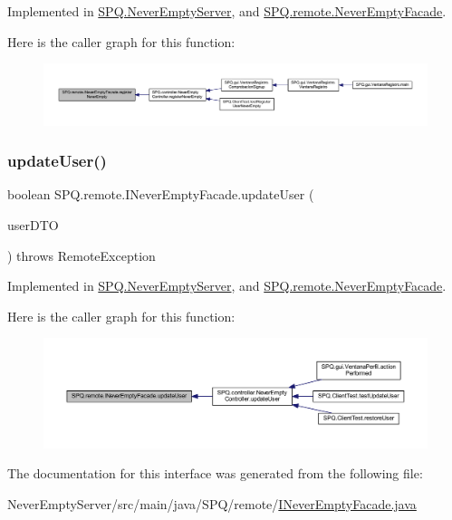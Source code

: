 Implemented in \mbox{\hyperlink{class_s_p_q_1_1_never_empty_server_ae52815c925e04018d6a1b2742d605063}{S\+P\+Q.\+Never\+Empty\+Server}}, and \mbox{\hyperlink{class_s_p_q_1_1remote_1_1_never_empty_facade_a52a0feff1dfb3347e55e46c3ac48fafc}{S\+P\+Q.\+remote.\+Never\+Empty\+Facade}}.

Here is the caller graph for this function\+:\nopagebreak
\begin{figure}[H]
\begin{center}
\leavevmode
\includegraphics[width=350pt]{interface_s_p_q_1_1remote_1_1_i_never_empty_facade_a7867e1e698fea32a535a1daeda4e8d6a_icgraph}
\end{center}
\end{figure}
\mbox{\label{interface_s_p_q_1_1remote_1_1_i_never_empty_facade_add6dafb25f59c549e924c76c6e8f31c6}} 
\subsubsection{\texorpdfstring{update\+User()}{updateUser()}}
{\footnotesize\ttfamily boolean S\+P\+Q.\+remote.\+I\+Never\+Empty\+Facade.\+update\+User (\begin{DoxyParamCaption}\item[{\mbox{\hyperlink{class_s_p_q_1_1dto_1_1_user_d_t_o}{User\+D\+TO}}}]{user\+D\+TO }\end{DoxyParamCaption}) throws Remote\+Exception}



Implemented in \mbox{\hyperlink{class_s_p_q_1_1_never_empty_server_ad39f95ea2309841407f7e8b9e1b9f664}{S\+P\+Q.\+Never\+Empty\+Server}}, and \mbox{\hyperlink{class_s_p_q_1_1remote_1_1_never_empty_facade_a55ad685d3c176424a7f5f18e5ebe043b}{S\+P\+Q.\+remote.\+Never\+Empty\+Facade}}.

Here is the caller graph for this function\+:\nopagebreak
\begin{figure}[H]
\begin{center}
\leavevmode
\includegraphics[width=350pt]{interface_s_p_q_1_1remote_1_1_i_never_empty_facade_add6dafb25f59c549e924c76c6e8f31c6_icgraph}
\end{center}
\end{figure}


The documentation for this interface was generated from the following file\+:\begin{DoxyCompactItemize}
\item 
Never\+Empty\+Server/src/main/java/\+S\+P\+Q/remote/\mbox{\hyperlink{_i_never_empty_facade_8java}{I\+Never\+Empty\+Facade.\+java}}\end{DoxyCompactItemize}
